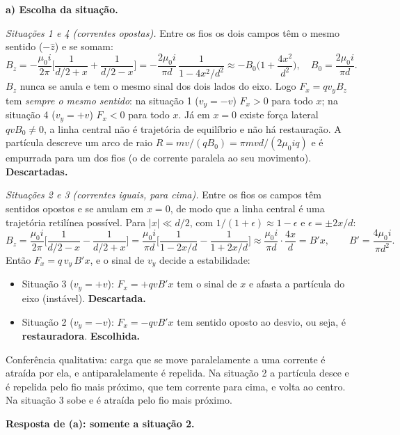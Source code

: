 \documentclass{article}%
\begin{document}
\textbf{a) Escolha da situação.}

\emph{Situações 1 e 4 (correntes opostas).} Entre os fios os dois campos têm o mesmo sentido ($-\hat z$) e se somam:
\[
B_z=-\frac{\mu_0 i}{2\pi}\Big[\frac1{d/2+x}+\frac1{d/2-x}\Big]=-\frac{2\mu_0 i}{\pi d}\,\frac{1}{1-4x^2/d^2}\approx -B_0\Big(1+\frac{4x^2}{d^2}\Big),\quad B_0=\frac{2\mu_0 i}{\pi d}.
\]
$B_z$ nunca se anula e tem o mesmo sinal dos dois lados do eixo. Logo $F_x=qv_yB_z$ tem \emph{sempre o mesmo sentido}: na situação 1 ($v_y=-v$) $F_x>0$ para todo $x$; na situação 4 ($v_y=+v$) $F_x<0$ para todo $x$. Já em $x=0$ existe força lateral $qvB_0\neq0$, a linha central não é trajetória de equilíbrio e não há restauração. A partícula descreve um arco de raio $R=mv/(qB_0)=\pi m v d/(2\mu_0 iq)$ e é empurrada para um dos fios (o de corrente paralela ao seu movimento). \textbf{Descartadas.}

\emph{Situações 2 e 3 (correntes iguais, para cima).} Entre os fios os campos têm sentidos opostos e se anulam em $x=0$, de modo que a linha central é uma trajetória retilínea possível. Para $|x|\ll d/2$, com $1/(1+\epsilon)\approx1-\epsilon$ e $\epsilon=\pm 2x/d$:
\[
B_z=\frac{\mu_0 i}{2\pi}\Big[\frac1{d/2-x}-\frac1{d/2+x}\Big]=\frac{\mu_0 i}{\pi d}\Big[\frac1{1-2x/d}-\frac1{1+2x/d}\Big]\approx\frac{\mu_0 i}{\pi d}\cdot\frac{4x}{d}=B'x,\qquad B'=\frac{4\mu_0 i}{\pi d^{2}} .
\]
Então $F_x=q\,v_y\,B'x$, e o sinal de $v_y$ decide a estabilidade:
\begin{itemize}
\item Situação 3 ($v_y=+v$): $F_x=+qvB'x$ tem o sinal de $x$ e afasta a partícula do eixo (instável). \textbf{Descartada.}
\item Situação 2 ($v_y=-v$): $F_x=-qvB'x$ tem sentido oposto ao desvio, ou seja, é \textbf{restauradora}. \textbf{Escolhida.}
\end{itemize}
Conferência qualitativa: carga que se move paralelamente a uma corrente é atraída por ela, e antiparalelamente é repelida. Na situação 2 a partícula desce e é repelida pelo fio mais próximo, que tem corrente para cima, e volta ao centro. Na situação 3 sobe e é atraída pelo fio mais próximo.

\textbf{Resposta de (a): somente a situação 2.}
\end{document}
